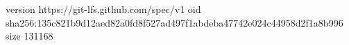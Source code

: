 version https://git-lfs.github.com/spec/v1
oid sha256:135c821b9d12aed82a0fd8f527ad497f1abdeba47742e024c44958d2f1a8b996
size 131168
